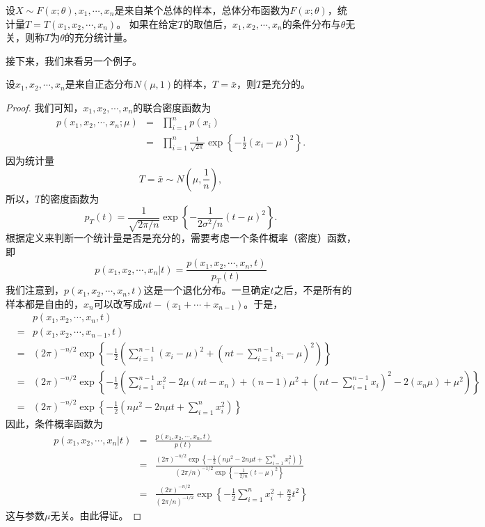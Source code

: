 \begin{definition}
设$X \sim F(x;\theta),x_1,\cdots,x_n$是来自某个总体的样本，总体分布函数为$F(x;\theta)$，统计量$T=T(x_1,x_2,\cdots,x_n)$。
如果在给定$T$的取值后，$x_1,x_2,\cdots,x_n$的条件分布与$\theta$无关，则称$T$为$\theta$的充分统计量。
\end{definition}

接下来，我们来看另一个例子。
\begin{example}
设$x_1,x_2,\cdots,x_n$是来自正态分布$N(\mu,1)$的样本，$T = \bar{x}$，则$T$是充分的。
\end{example}
\begin{proof}
我们可知，$x_1,x_2,\cdots,x_n$的联合密度函数为
\begin{eqnarray*}
    p(x_1,x_2,\cdots,x_n;\mu) &=&  \prod_{i=1}^n p(x_i) \\
    &=& \prod_{i=1}^n \frac{1}{\sqrt{2\pi }} \exp\left\{-\frac{1}{2}(x_i - \mu)^2\right\}.
\end{eqnarray*}
因为统计量
$$
T = \bar{x} \sim N(\mu,\frac{1}{n}),
$$
所以，$T$的密度函数为
$$
p_T(t) = \frac{1}{\sqrt{2\pi/n}}\exp\left\{-\frac{1}{2\sigma^2/n} (t-\mu)^2\right\}.
$$
根据定义来判断一个统计量是否是充分的，需要考虑一个条件概率（密度）函数，即
$$
p(x_1,x_2,\cdots,x_n|t) = \frac{p(x_1,x_2,\cdots,x_n,t)}{p_T(t)}
$$ 
我们注意到，$p(x_1,x_2,\cdots,x_n,t)$这是一个退化分布。一旦确定$t$之后，不是所有的样本都是自由的，$x_n $可以改写成$nt - (x_1+\cdots+x_{n-1})$。于是，
\begin{eqnarray*}
   && p(x_1,x_2,\cdots,x_n,t) \\
   &=& p(x_1,x_2,\cdots,x_{n-1},t)\\
    &=& (2\pi)^{-n/2}\exp\left\{-\frac{1}{2}\left( \sum_{i=1}^{n-1}(x_i - \mu)^2 + \left(nt - \sum_{i=1}^{n-1} x_i -\mu \right)^2 \right)\right\}\\
    &=& (2\pi)^{-n/2} \exp\left\{
    -\frac{1}{2}\left( \sum_{i=1}^{n-1} x_i^2 - 2\mu(nt - x_n) + (n-1)\mu^2 + \left(nt - \sum_{i=1}^{n-1} x_i\right)^2 - 2(x_n \mu) + \mu^2
    \right)
    \right\}\\
    &=&(2\pi)^{-n/2} \exp\left\{ -\frac{1}{2}\left( n\mu^2 - 2n \mu t + \sum_{i=1}^n x_i^2\right) \right\}
\end{eqnarray*}
因此，条件概率函数为
\begin{eqnarray*}
    p(x_1,x_2,\cdots,x_n|t) &=& \frac{p(x_1,x_2,\cdots,x_n,t)}{p(t)} \\
    &=& \frac{(2\pi)^{-n/2} \exp\left\{ -\frac{1}{2}\left( n\mu^2 - 2n \mu t + \sum_{i=1}^n x_i^2\right) \right\}}{ (2\pi/n)^{-1/2} \exp\left\{ -\frac{1}{2/n} \left(t-\mu\right)^2 \right\}} \\
    &=& \frac{(2\pi)^{-n/2}}{(2\pi/n)^{-1/2} } \exp\left\{
    -\frac{1}{2}\sum_{i=1}^n x_i^2 + \frac{n}{2}t^2
    \right\}
\end{eqnarray*}
这与参数$\mu$无关。由此得证。
\end{proof}

